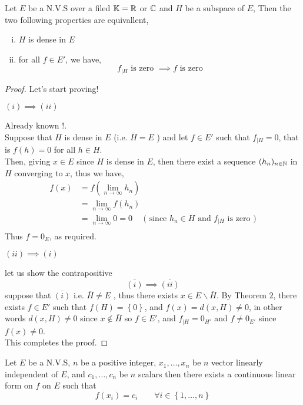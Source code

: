 \begin{theorem}[Theorem 3]
	Let $E $ be a N.V.S over a filed $\mathbb{K} = \mathbb{R} $ or $\mathbb{C}  $ 
	and $H $ be a subspace of $E $, Then the two following properties
	are equivallent, 
	\begin{enumerate}[(i)]
	\item $H $ is dense in $E $  
	\item for all $f \in  E' $, we have, 
		\[
		f_{|H} \text{ is zero }  \implies 
		f \text{ is zero} 
		\]
	\end{enumerate}
\end{theorem}
\begin{proof}
Let's start proving!
\begin{center}
	$(i) \implies  (ii)   $ 
\end{center}
Already known !. \\
Suppose that $H $ is dense in $E $  (i.e. $\overline{H}=  E $ ) and 
let $f \in  E' $ such that 
$f_{|H} = 0 $, that is $f(h) = 0$ for all $h \in  H $. \\
Then, giving $x \in  E $ since $H $ is dense in $E $, then there exist
a sequence $(h_{n}) _{n \in  \mathbb{N}} $  
in $H $ converging to $x $, thus we have, 
\begin{align*}
	f(x) &= f(\lim_{n \to \infty} h_{n})  \\ 
	     &= \lim_{n \to \infty} f(h_{n})  \\
	     &= \lim_{n \to \infty}  0  = 0
	     \quad \text{ ( since $h_{n} \in  H $ and $f_{|H} $ is zero )} \\
\end{align*}
Thus $f = 0_{E} $, as required.
\begin{center}
	$(ii)  \implies  (i)  $ 
\end{center}
let us show the contrapositive 
\[
	\overline{(i) } \implies 
	\overline{(ii) }
\]
suppose that $\overline{(i)}$ i.e. 
$\overline{H} \neq  E $ , thus there exists $x \in  E \backslash \overline{H} $.
By Theorem $2$, there exists $f \in  E' $  such that $f(H)  = \left\{ 0 \right\}$, 
and $f(x) = d(x,H)  \neq  0$, in other words $d(x,H) \neq 0$ since $x \notin \overline{H} $   
so $f \in  E'$, and $f_{|H}= 0_{H'} $ and $f \neq  0_{E'} $ since $f(x) \neq 0$. \\
This completes the proof.
\end{proof}
\begin{theorem}[Theorem 4]
	Let $E $ be a N.V.S, $n $ be a positive integer, 
	$x_1, \hdots , x_{n} $  be $n $ vector linearly independent of $E $, 
	and $c_1, \hdots , c_{n}$  be $n $ scalars then there exists
	a continuous linear form on $f  $ on $E $ such that 
	\[
	f(x_{i})  = c_{i} \quad \quad 
	\forall  i \in  \left\{ 1, \hdots , n  \right\}
	\]
\end{theorem}
% 











